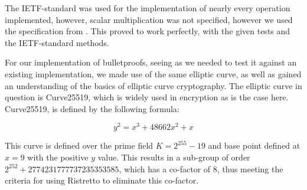 \documentclass{article}
\begin{document}
The IETF-standard was used for the implementation of nearly every
operation implemented, however, scalar multiplication was not specified,
however we used the specification from \cite{elliptic-curves}. This proved to work perfectly, with the given tests and the
IETF-standard methods.

For our implementation of bulletproofs, seeing as we needed to test it
against an existing implementation, we made use of the same elliptic
curve, as well as gained an understanding of the basics of elliptic
curve cryptography. The elliptic curve in question is Curve25519, which
is widely used in encryption as is the case here. Curve25519, is defined by the following formula:

$$y^2 = x^3 + 48662x^2 + x$$

This curve is defined over the prime field $K = 2^{255} - 19$ and base
point defined at $x = 9$ with the positive $y$ value. This results in a
sub-group of order $2^{252} + 2774231777737235353585$, which has a
co-factor of $8$, thus meeting the criteria for using Ristretto to eliminate this co-factor.
\end{document}
